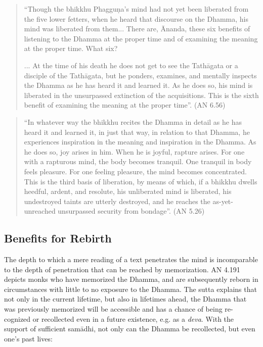 \begin{quote}
  ``Though the bhikkhu Phagguṇa's mind had not yet been liberated from the five lower fetters, when he heard that discourse on the Dhamma, his mind was liberated from them... There are, Ānanda, these six benefits of listening to the Dhamma at the proper time and of examining the meaning at the proper time. What six?

  ... At the time of his death he does not get to see the Tathāgata or a disciple of the Tathāgata, but he ponders, examines, and mentally inspects the Dhamma as he has heard it and learned it. As he does so, his mind is liberated in the unsurpassed extinction of the acquisitions. This is the sixth benefit of examining the meaning at the proper time''. (AN 6.56)
\end{quote}

\begin{quote}
  ``In whatever way the bhikkhu recites the Dhamma in detail as he has heard it and learned it, in just that way, in relation to that Dhamma, he experiences inspiration in the meaning and inspiration in the Dhamma. As he does so, joy arises in him. When he is joyful, rapture arises. For one with a rapturous mind, the body becomes tranquil. One tranquil in body feels pleasure. For one feeling pleasure, the mind becomes concentrated. This is the third basis of liberation, by means of which, if a bhikkhu dwells heedful, ardent, and resolute, his unliberated mind is liberated, his undestroyed taints are utterly destroyed, and he reaches the as-yet-unreached unsurpassed security from bondage''. (AN 5.26)
\end{quote}

\subsection*{Benefits for Rebirth}

The depth to which a mere reading of a text penetrates the mind is incomparable to the depth of penetration that can be reached by memorization. AN 4.191 depicts monks who have memorized the Dhamma, and are subsequently reborn in circumstances with little to no exposure to the Dhamma. The sutta explains that not only in the current lifetime, but also in lifetimes ahead, the Dhamma that was previously memorized will be accessible and has a chance of being re-cognized or recollected even in a future existence, e.g. as a \textit{deva}. With the support of sufficient samādhi, not only can the Dhamma be recollected, but even one's past lives:


